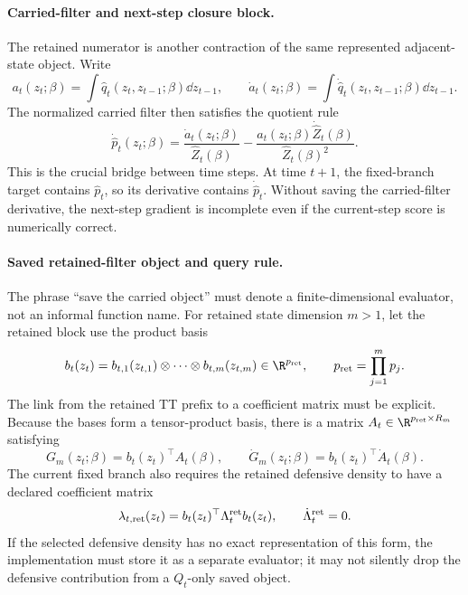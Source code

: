 \paragraph{Carried-filter and next-step closure block.}
The retained numerator is another contraction of the same represented
adjacent-state object.  Write
\begin{equation}
  a_t(z_t;\beta)=
  \int \widehat q_t(z_t,z_{t-1};\beta)\dd z_{t-1},
  \qquad
  \dot a_t(z_t;\beta)=
  \int \dot{\widehat q}_t(z_t,z_{t-1};\beta)\dd z_{t-1}.
  \label{eq:bf-hd-ttkr-carried-numerator}
\end{equation}
The normalized carried filter then satisfies the quotient rule
\begin{equation}
  \dot{\widehat p}_t(z_t;\beta)=
  \frac{\dot a_t(z_t;\beta)}{\widehat Z_t(\beta)}
  -
  \frac{a_t(z_t;\beta)\dot{\widehat Z}_t(\beta)}{\widehat Z_t(\beta)^2}.
  \label{eq:bf-hd-ttkr-dot-carried-filter}
\end{equation}
This is the crucial bridge between time steps.  At time \(t+1\), the fixed-branch
target contains \(\widehat p_t\), so its derivative contains
\(\dot{\widehat p}_t\).  Without saving the carried-filter derivative, the
next-step gradient is incomplete even if the current-step score is numerically
correct.

\paragraph{Saved retained-filter object and query rule.}
The phrase “save the carried object” must denote a finite-dimensional evaluator,
not an informal function name.  For retained state dimension $m>1$, let the
retained block use the product basis
\begin{equation}
  b_t(z_t)=b_{t,1}(z_{t,1})\otimes\cdots\otimes b_{t,m}(z_{t,m})
  \in\R^{p_{\rm ret}},
  \qquad
  p_{\rm ret}=\prod_{j=1}^m p_j.
  \label{eq:bf-hd-ttkr-retained-product-basis}
\end{equation}
The link from the retained TT prefix to a coefficient matrix must be explicit.
Because the bases form a tensor-product basis, there is a matrix
\(A_t\in\R^{p_{\rm ret}\times R_m}\) satisfying
\begin{equation}
  G_m(z_t;\beta)=b_t(z_t)^\top A_t(\beta),
  \qquad
  \dot G_m(z_t;\beta)=b_t(z_t)^\top\dot A_t(\beta).
  \label{eq:bf-hd-ttkr-retained-prefix-coefficients}
\end{equation}
The current fixed branch also requires the retained defensive density to have a
declared coefficient matrix
\begin{equation}
  \lambda_{t,\mathrm{ret}}(z_t)
  =b_t(z_t)^\top\Lambda_t^{\rm ret}b_t(z_t),
  \qquad
  \dot\Lambda_t^{\rm ret}=0.
  \label{eq:bf-hd-ttkr-defensive-retained-coefficients}
\end{equation}
If the selected defensive density has no exact representation of this form,
the implementation must store it as a separate evaluator; it may not silently
drop the defensive contribution from a \(Q_t\)-only saved object.

